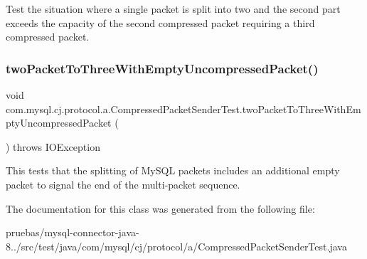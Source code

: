 Test the situation where a single packet is split into two and the second part exceeds the capacity of the second compressed packet requiring a third compressed packet. \mbox{\label{classcom_1_1mysql_1_1cj_1_1protocol_1_1a_1_1_compressed_packet_sender_test_ac8e6517377ed11a4566c755ffc1b65de}} 
\subsubsection{\texorpdfstring{two\+Packet\+To\+Three\+With\+Empty\+Uncompressed\+Packet()}{twoPacketToThreeWithEmptyUncompressedPacket()}}
{\footnotesize\ttfamily void com.\+mysql.\+cj.\+protocol.\+a.\+Compressed\+Packet\+Sender\+Test.\+two\+Packet\+To\+Three\+With\+Empty\+Uncompressed\+Packet (\begin{DoxyParamCaption}{ }\end{DoxyParamCaption}) throws I\+O\+Exception}

This tests that the splitting of My\+S\+QL packets includes an additional empty packet to signal the end of the multi-\/packet sequence. 

The documentation for this class was generated from the following file\+:\begin{DoxyCompactItemize}
\item 
pruebas/mysql-\/connector-\/java-\/8../src/test/java/com/mysql/cj/protocol/a/Compressed\+Packet\+Sender\+Test.\+java\end{DoxyCompactItemize}

